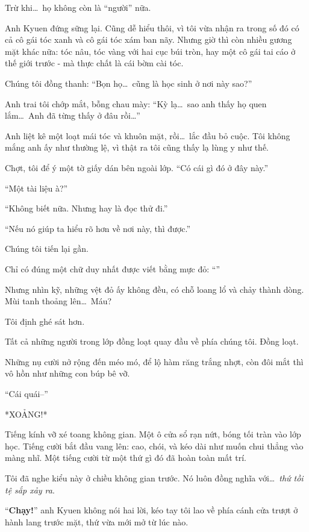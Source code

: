 \documentclass[../main.tex]{subfiles}
\begin{document}
Trừ khi\dots\ họ không còn là ``người'' nữa.

Anh Kyuen đứng sững lại. Cũng dễ hiểu thôi, vì tôi vừa nhận ra trong số đó có cả cô gái tóc xanh và cô gái tóc xám ban nãy. Nhưng giờ thì còn nhiều gương mặt khác nữa: tóc nâu, tóc vàng với hai cục búi tròn, hay một cô gái tai cáo ở thế giới trước - mà thực chất là cái bờm cài tóc.

Chúng tôi đồng thanh: ``Bọn họ\dots\ cũng là học sinh ở nơi này sao?''

Anh trai tôi chớp mắt, bỗng chau mày: ``Kỳ lạ\dots\ sao anh thấy họ quen lắm\dots\ Anh đã từng thấy ở đâu rồi\dots''

Anh liệt kê một loạt mái tóc và khuôn mặt, rồi\dots\ lắc đầu bỏ cuộc. Tôi không mắng anh ấy như thường lệ, vì thật ra tôi cũng thấy lạ lùng y như thế.

Chợt, tôi để ý một tờ giấy dán bên ngoài lớp. ``Có cái gì đó ở đây này.''

``Một tài liệu à?''

``Không biết nữa. Nhưng hay là đọc thử đi.''

``Nếu nó giúp ta hiểu rõ hơn về nơi này, thì được.''

Chúng tôi tiến lại gần.

Chỉ có đúng một chữ duy nhất được viết bằng mực đỏ: ``''

Nhưng nhìn kỹ, những vệt đỏ ấy không đều, có chỗ loang lổ và chảy thành dòng. Mùi tanh thoảng lên\dots\ Máu?

Tôi định ghé sát hơn.

Tất cả những người trong lớp đồng loạt quay đầu về phía chúng tôi. Đồng loạt.

Những nụ cười nở rộng đến méo mó, để lộ hàm răng trắng nhợt, còn đôi mắt thì vô hồn như những con búp bê vỡ.

``Cái quái--''


*XOẢNG!*

Tiếng kính vỡ xé toang không gian. Một ô cửa sổ rạn nứt, bóng tối tràn vào lớp học. Tiếng cười bắt đầu vang lên: cao, chói, và kéo dài như muốn chui thẳng vào màng nhĩ. Một tiếng cười từ một thứ gì đó đã hoàn toàn mất trí.

Tôi đã nghe kiểu này ở chiều không gian trước. Nó luôn đồng nghĩa với\dots\ \emph{thứ tồi tệ sắp xảy ra}.

``\textbf{Chạy!}'' anh Kyuen không nói hai lời, kéo tay tôi lao về phía cánh cửa trượt ở hành lang trước mặt, thứ vừa mới mở từ lúc nào.
\end{document}
